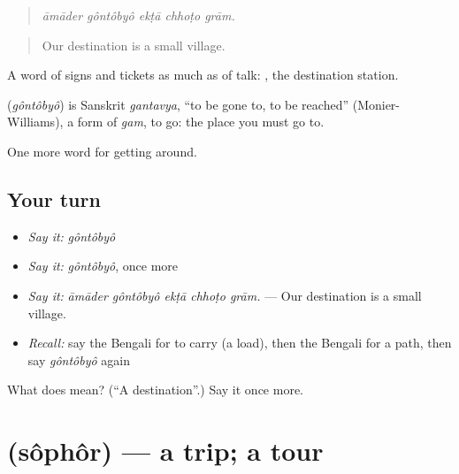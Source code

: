 \begin{quote}
    
\end{quote}

\begin{quote}
\emph{āmāder gôntôbyô ekṭā chhoṭo grām.}
\end{quote}

\begin{quote}
Our destination is a small village.
\end{quote}

A word of signs and tickets as much as of talk:  , the destination station.

\begin{cousinweb}
\textbf{} (\emph{gôntôbyô}) is Sanskrit \emph{gantavya}, \textquotedblleft{}to be gone to, to be reached\textquotedblright{} (Monier-Williams), a form of \emph{gam}, to go: the place you must go to.
\end{cousinweb}

\begin{grammarlens}[title={What you've built}]
One more word for getting around.
\end{grammarlens}

\subsection*{Your turn}
\begin{itemize}
\raggedright
  \item \emph{Say it:} \emph{gôntôbyô}
  \item \emph{Say it:} \emph{gôntôbyô}, once more
  \item \emph{Say it:} \emph{āmāder gôntôbyô ekṭā chhoṭo grām.} — Our destination is a small village.
  \item \emph{Recall:} say the Bengali for to carry (a load), then the Bengali for a path, then say \emph{gôntôbyô} again
\end{itemize}

\begin{tcolorbox}[breakable,colback=teal!4,colframe=teal!35!black,title={Before you move on}]
What does  mean? (\textquotedblleft{}A destination\textquotedblright{}.) Say it once more.
\end{tcolorbox}
\section[\texorpdfstring{\bn{সফর} (sôphôr)}{সফর (sôphôr)}]{ (sôphôr) — a trip; a tour}


